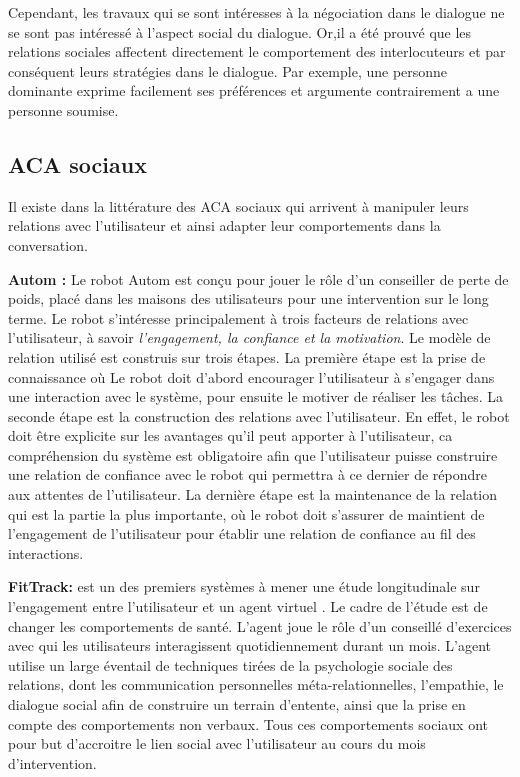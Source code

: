 \documentclass[a4paper,french]{article}
\begin{document}
\par Cependant, les travaux qui se sont intéresses à la négociation \cite{amgoud2000arguments,mcburney2004denotational,daskalopulu1998handling} dans le dialogue ne se sont pas intéressé à l'aspect social du dialogue. Or,il a été prouvé que les relations sociales affectent directement le comportement des interlocuteurs \cite{bickmore2000weather, bickmore2005establishing, moon1998intimate, nass2000does} et par conséquent leurs stratégies dans le dialogue. Par exemple, une personne dominante exprime facilement ses préférences et argumente contrairement a une personne soumise. 

\subsection{ACA sociaux}
\par Il existe dans la littérature des  ACA sociaux  qui arrivent à manipuler leurs relations avec l'utilisateur et ainsi adapter leur comportements dans la conversation.


\par \textbf{Autom :} Le robot Autom \cite{kidd2005sociable} est conçu pour jouer le rôle d'un conseiller de perte de poids, placé dans les maisons des utilisateurs pour une intervention sur le long terme. Le robot s'intéresse principalement à trois facteurs de relations avec l'utilisateur, à savoir \textit{l'engagement, la confiance et la motivation}.  Le modèle de relation utilisé est construis sur trois étapes. La première étape est la prise de connaissance où Le robot doit  d'abord encourager l'utilisateur à s'engager dans une interaction avec le système, pour ensuite le motiver de réaliser les tâches.
La seconde étape est la construction des relations avec l'utilisateur. En effet, le robot doit être explicite sur les avantages qu'il peut apporter à l'utilisateur, ca compréhension du système est obligatoire afin que l'utilisateur puisse construire une relation de confiance avec le robot qui permettra à ce dernier de répondre aux attentes de l'utilisateur.  La dernière étape est la maintenance de la relation qui est la partie la plus importante, où le robot doit s'assurer de maintient de l'engagement de l'utilisateur pour établir une relation de confiance au fil des interactions.


\par \textbf{FitTrack: } est un des premiers systèmes à mener une étude longitudinale sur l'engagement entre l'utilisateur et un agent virtuel \cite{bickmore2005s}. Le cadre de l'étude est de changer les comportements de santé. L'agent joue le rôle d'un conseillé d'exercices avec qui les utilisateurs interagissent quotidiennement durant un mois. L'agent utilise un large éventail de techniques tirées de la psychologie sociale des relations, dont les communication personnelles méta-relationnelles, l'empathie, le dialogue social afin de construire un terrain d'entente, ainsi que la prise en compte des comportements non verbaux. Tous ces comportements sociaux ont pour but d'accroitre le lien social avec l'utilisateur au cours du mois d'intervention.
\end{document}
